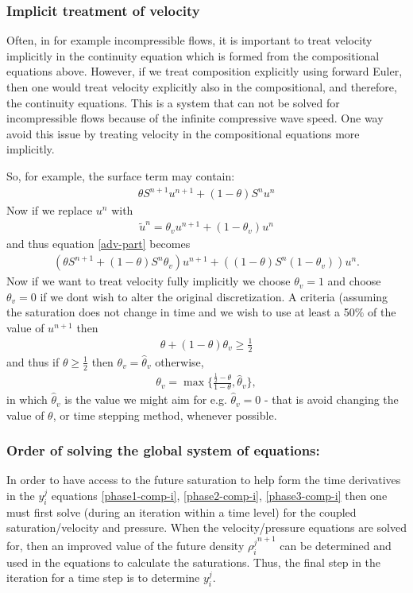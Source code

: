 \subsubsection{Implicit treatment of velocity}
Often, in for example incompressible flows, it is important to treat velocity
implicitly in the continuity equation which is formed from the compositional
equations above. However, if we treat composition explicitly using forward Euler, then
one would treat velocity explicitly also in the compositional, and therefore, the
continuity equations. This is a system that can not be solved for incompressible
flows because of the infinite compressive wave speed. One way avoid this issue
by treating velocity in the compositional equations more implicitly.

So, for example, the surface term may contain:
\begin{eqnarray}
\theta S^{n+1} u^{n+1} + (1-\theta) S^n u^n \label{adv-part}
\end{eqnarray}
Now if we replace $u^n$ with
\begin{eqnarray}
\tilde u^n = \theta_v u^{n+1} + (1-\theta_v) u^n
\end{eqnarray}
and thus equation \ref{adv-part} becomes
\begin{eqnarray}
(\theta S^{n+1} +(1-\theta) S^{n}\theta_v ) u^{n+1} + ((1-\theta) S^n (1-\theta_v)) u^n .
\label{adv-part-implicit-vel}
\end{eqnarray}
Now if we want to treat velocity fully implicitly we choose $\theta_v=1$ and choose
$\theta_v=0$ if we dont wish to alter the original discretization.
A criteria (assuming the saturation does not change in time and we wish to use
at least a 50$\%$ of the value of $u^{n+1}$ then
\begin{eqnarray}
\theta+(1-\theta)\theta_v\ge \frac{1}{2}
\end{eqnarray}
and thus if $\theta\ge\frac{1}{2}$ then $\theta_v = \hat\theta_v$ otherwise,
\begin{eqnarray}
\theta_v =\max\{ \frac{\frac{1}{2}-\theta}{1-\theta}, \hat\theta_v \} ,
\end{eqnarray}
in which $\hat\theta_v$ is the value we might aim for e.g.  $\hat\theta_v=0$ - that is avoid changing the
value of $\theta$, or time stepping method, whenever possible.



\subsubsection{Order of solving the global system of equations:} In order to have access to
the future saturation to help form the time derivatives in the $y_i^j$
equations
\ref{phase1-comp-i}, \ref{phase2-comp-i}, \ref{phase3-comp-i} then one must first solve
(during an iteration within a time level) for the coupled saturation/velocity and
pressure. When the velocity/pressure equations are solved for, then an improved
value of the future density ${\rho^j_i}^{n+1}$ can be determined and used in
the equations to calculate the saturations. Thus, the final step in the iteration
for a time step is to determine $y_i^j$.



